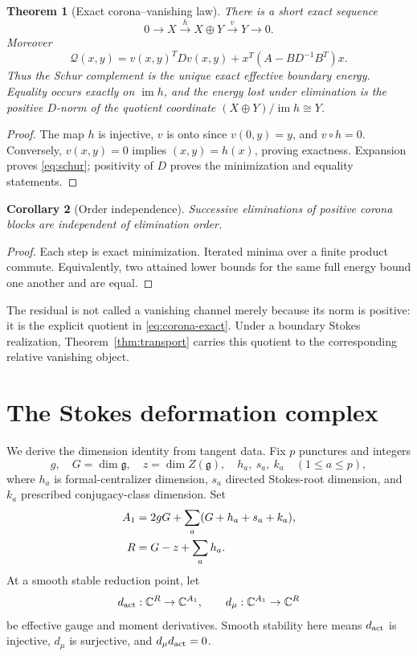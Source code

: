 \documentclass[11pt,a4paper]{amsart}
\theoremstyle{plain}
\newtheorem{theorem}{Theorem}[section]
\newtheorem{corollary}[theorem]{Corollary}
\theoremstyle{definition}
\newcommand{\CC}{\mathbb C}
\newcommand{\im}{\operatorname{im}}
\begin{document}
\begin{theorem}[Exact corona--vanishing law]\label{thm:corona}
There is a short exact sequence
\begin{equation}\label{eq:corona-exact}
              0\longrightarrow X\xrightarrow{h}X\oplus Y
              \xrightarrow{v}Y\longrightarrow0.
\end{equation}
Moreover
\begin{equation}\label{eq:schur}
 \boxed{\mathcal Q(x,y)=v(x,y)^TDv(x,y)+x^T(A-BD^{-1}B^T)x.}
\end{equation}
Thus the Schur complement is the unique exact effective boundary energy.  Equality occurs exactly
on $\im h$, and the energy lost under elimination is the positive $D$-norm of the quotient
coordinate $(X\oplus Y)/\im h\cong Y$.
\end{theorem}

\begin{proof}
The map $h$ is injective, $v$ is onto since $v(0,y)=y$, and $v\circ h=0$.  Conversely,
$v(x,y)=0$ implies $(x,y)=h(x)$, proving exactness.  Expansion proves \eqref{eq:schur}; positivity
of $D$ proves the minimization and equality statements.
\end{proof}

\begin{corollary}[Order independence]\label{cor:order}
Successive eliminations of positive corona blocks are independent of elimination order.
\end{corollary}

\begin{proof}
Each step is exact minimization.  Iterated minima over a finite product commute.  Equivalently,
two attained lower bounds for the same full energy bound one another and are equal.
\end{proof}

The residual is not called a vanishing channel merely because its norm is positive: it is the
explicit quotient in \eqref{eq:corona-exact}.  Under a boundary Stokes realization,
Theorem~\ref{thm:transport} carries this quotient to the corresponding relative vanishing object.

\section{The Stokes deformation complex}\label{sec:deformation}

We derive the dimension identity from tangent data.  Fix $p$ punctures and integers
\[
 g,\quad G=\dim\mathfrak g,\quad z=\dim Z(\mathfrak g),\quad
 h_a,\ s_a,\ k_a\quad(1\leq a\leq p),
\]
where $h_a$ is formal-centralizer dimension, $s_a$ directed Stokes-root dimension, and $k_a$
prescribed conjugacy-class dimension.  Set
\begin{align}\label{eq:factor-counts}
 A_1&=2gG+\sum_a(G+h_a+s_a+k_a),\\
 R&=G-z+\sum_ah_a.\notag
\end{align}
At a smooth stable reduction point, let
\[
 d_{\rm act}:\CC^R\to\CC^{A_1},\qquad d_\mu:\CC^{A_1}\to\CC^R
\]
be effective gauge and moment derivatives.  Smooth stability here means $d_{\rm act}$ is
injective, $d_\mu$ is surjective, and $d_\mu d_{\rm act}=0$.
\end{document}
